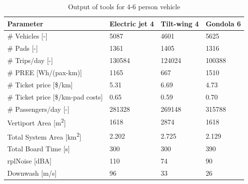 \begin{table}[H]
\captionsetup{justification=centering}
\caption{Output of tools for 4-6 person vehicle}
\label{46output}
\begin{tabular}{@{}llll@{}}
\toprule
\textbf{Parameter}                           & \textbf{Electric jet 4} & \textbf{Tilt-wing 4} & \textbf{Gondola 6} \\ \midrule
\# Vehicles {[}-{]}                          & 5087                   & 4601                   & 5625                   \\
\# Pads {[}-{]}                              & 1361                   & 1405                   & 1316                    \\
\# Trips/day {[}-{]}                         & 130584                   & 124024               & 100388                   \\
\# PREE {[}Wh/(pax-km){]}                   & 1165                     & 667                    & 1510  \\
\# Ticket price {[}\$/km{]}                  & 5.31                   & 6.69                   & 4.73                    \\
\# Ticket price {[}\$/km-pad costs{]}        & 0.65                    & 0.59                   & 0.70                   \\
\# Passengers/day {[}-{]}                    & 281328                   & 269148                   & 315788                    \\
Vertiport Area {[}m\textsuperscript{2}{]}    & 1618                   & 2874                   & 1618                    \\
Total System Area {[}km\textsuperscript{2}{]}& 2.202                   & 2.725                   & 2.129                   \\
Total Board Time {[}s{]}                     & 300                    & 300                   & 390                   \\
rplNoise {[}dBA{]}                              & 110                   & 74                   & 90                    \\
Downwash {[}m/s{]}                              &             96       &     33          &          26        \\\bottomrule
\end{tabular}
\end{table}


